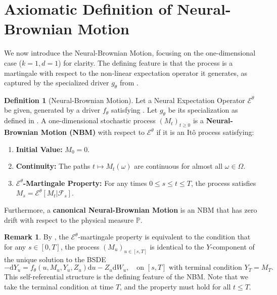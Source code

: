 \documentclass[qian]{imsart}
\newcommand{\Prob}{\mathbb{P}}
\newcommand{\Fcal}{\mathcal{F}}
\newcommand{\cEneutheta}{\mathcal{E}^{\theta}}
\newcommand{\dd}{\mathrm{d}}
\theoremstyle{plain}
\theoremstyle{definition}
\newtheorem{definition}[theorem]{Definition}
\newtheorem{remark}[theorem]{Remark}
\begin{document}
\section{Axiomatic Definition of Neural-Brownian Motion}
\label{sec:axiomatic_nbm}

We now introduce the Neural-Brownian Motion, focusing on the one-dimensional case ($k=1, d=1$) for clarity. The defining feature is that the process is a martingale with respect to the non-linear expectation operator it generates, as captured by the specialized driver $g_\theta$ from .

\begin{definition}[Neural-Brownian Motion]
\label{def:nbm_axioms}
Let a Neural Expectation Operator $\cEneutheta$ be given, generated by a driver $f_\theta$ satisfying . Let $g_\theta$ be its specialization as defined in . A one-dimensional stochastic process $(M_t)_{t \ge 0}$ is a \textbf{Neural-Brownian Motion (NBM)} with respect to $\cEneutheta$ if it is an Itô process satisfying:
\begin{enumerate}[label=(\roman*), leftmargin=*]
    \item \textbf{Initial Value:} $M_0 = 0$.
    \item \textbf{Continuity:} The paths $t \mapsto M_t(\omega)$ are continuous for almost all $\omega \in \Omega$.
    \item \textbf{$\cEneutheta$-Martingale Property:} For any times $0 \le s \le t \le T$, the process satisfies $M_s = \cEneutheta[M_t | \Fcal_s]$.
\end{enumerate}
Furthermore, a \textbf{canonical Neural-Brownian Motion} is an NBM that has zero drift with respect to the physical measure $\Prob$.
\end{definition}

\begin{remark}
By , the $\cEneutheta$-martingale property is equivalent to the condition that for any $s \in [0,T]$, the process $(M_u)_{u \in [s,T]}$ is identical to the $Y$-component of the unique solution to the BSDE
\[ -\dd Y_u = f_\theta(u, M_u, Y_u, Z_u)\dd u - Z_u \dd W_u, \quad \text{on } [s,T] \text{ with terminal condition } Y_T = M_T. \]
This self-referential structure is the defining feature of the NBM. Note that we take the terminal condition at time $T$, and the property must hold for all $t \leq T$.
\end{remark}
\end{document}
